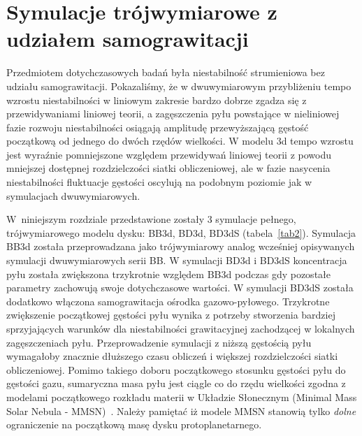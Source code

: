 \section{Symulacje trójwymiarowe z udziałem samograwitacji}
\label{sec:sim_3d}
Przedmiotem dotychczasowych badań była niestabilność strumieniowa bez udziału
samograwitacji. Pokazaliśmy, że w dwuwymiarowym przybliżeniu tempo wzrostu
niestabilności w liniowym zakresie bardzo dobrze zgadza się z przewidywaniami
liniowej teorii, a zagęszczenia pyłu powstające w nieliniowej fazie rozwoju
niestabilności osiągają amplitudę przewyższającą gęstość początkową od jednego
do dwóch rzędów wielkości. W modelu 3d tempo wzrostu jest wyraźnie pomniejszone
względem przewidywań liniowej teorii z powodu mniejszej dostępnej rozdzielczości
siatki obliczeniowej, ale w fazie nasycenia niestabilności fluktuacje
gęstości oscylują na podobnym poziomie jak w symulacjach dwuwymiarowych. 
%
\par W~niniejszym rozdziale przedstawione zostały 3 symulacje pełnego,
trójwymiarowego modelu dysku: BB3d, BD3d, BD3dS (tabela~\ref{tab2}).  Symulacja
BB3d została przeprowadzana jako trójwymiarowy analog wcześniej opisywanych
symulacji dwuwymiarowych serii BB. W symulacji BD3d i BD3dS koncentracja pyłu
została zwiększona trzykrotnie względem BB3d podczas gdy pozostałe parametry
zachowują swoje dotychczasowe wartości. W symulacji BD3dS została dodatkowo
włączona samograwitacja ośrodka gazowo-pyłowego. Trzykrotne zwiększenie
początkowej gęstości pyłu wynika z potrzeby stworzenia bardziej
sprzyjających warunków dla niestabilności grawitacyjnej zachodzącej w lokalnych
zagęszczeniach pyłu. Przeprowadzenie symulacji z niższą gęstością pyłu
wymagałoby znacznie dłuższego czasu obliczeń i większej rozdzielczości siatki
obliczeniowej. Pomimo takiego doboru początkowego stosunku gęstości pyłu do
gęstości gazu, sumaryczna masa pyłu jest ciągle co do rzędu wielkości zgodna z
modelami początkowego rozkładu materii w Układzie Słonecznym (Minimal Mass Solar
Nebula - MMSN)~\cite{D07}. Należy
pamiętać iż modele MMSN stanowią tylko \emph{dolne} ograniczenie na początkową
masę dysku protoplanetarnego.

